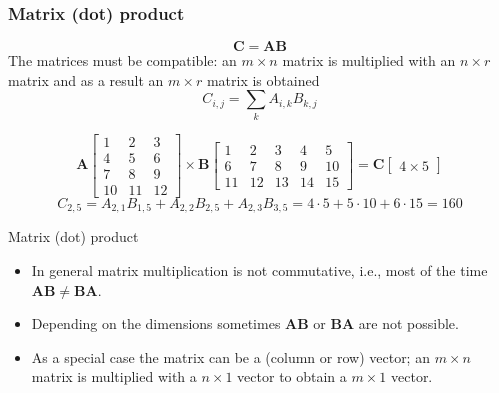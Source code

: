 \documentclass[notes]{beamer}          %
\newcommand{\vect}[1]{\bm{#1}}
\newcommand{\field}[1]{\mathbb{#1}}
\newcommand{\R}{\field{R}}
\newif\iffull
\begin{document}
\iffull
\begin{frame}
\frametitle{Identity matrix}
    \begin{itemize}
        \item Identity matrix $\vect{I}_3$
        $$\begin{bmatrix}
            1 & 0 & 0 \\
            0 & 1 & 0 \\
            0 & 0 & 1
          \end{bmatrix}$$

        \item The identity matrices are neutral elements in matrix-matrix and matrix-vector multiplication, e.g.
        $$\forall \vect{x} \in \R^n: \vect{I}_n \vect{x} = \vect{x} \vect{I}_n = \vect{x} $$
    \end{itemize}

\end{frame}
\fi

\begin{frame}
\frametitle{Matrix (dot) product}

    $$\vect{C} = \vect{A}\vect{B}$$
    The matrices must be compatible: an $m \times n$ matrix is multiplied with an $n \times r$ matrix and as a result an $m \times r$ matrix is obtained
    $$C_{i,j} = \sum_k A_{i,k}B_{k,j}$$

    $$
    \vect{A}
    \begin{bmatrix}
       1 & 2 & 3 \\
       4 & 5 & 6 \\
       7 & 8 & 9 \\
       10 & 11 & 12
    \end{bmatrix}
    \times
    \vect{B}
    \begin{bmatrix}
        1 & 2 & 3 & 4 & 5 \\
        6 & 7 & 8 & 9 & 10 \\
        11 & 12 & 13 & 14 & 15
    \end{bmatrix} =
    \vect{C}
    \begin{bmatrix}
       4 \times 5
    \end{bmatrix}
    $$
    $$ C_{2,5} = A_{2,1}B_{1,5} + A_{2,2}B_{2,5} + A_{2,3}B_{3,5} = 4 \cdot 5 + 5 \cdot 10 + 6 \cdot 15 = 160 $$

\end{frame}

\begin{frame}{Matrix (dot) product}
    \begin{itemize}
        \item In general matrix multiplication is not commutative, i.e., most of the time $\vect{A}\vect{B} \not = \vect{B}\vect{A}$.
        \item Depending on the dimensions sometimes $\vect{A} \vect{B}$ or $\vect{B} \vect{A}$ are not possible.
        \item As a special case the matrix can be a (column or row) vector; an $m \times n$ matrix is multiplied with a $n \times 1$ vector to obtain a $m \times 1$ vector.
    \end{itemize}
\end{frame}
\end{document}
